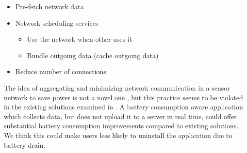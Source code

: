 \begin{itemize}
	\setlength\itemsep{-0.3em}
    \item Pre-fetch network data
    \item Network scheduling services
    \vspace{-0.8em}
    \begin{itemize}
    	\setlength\itemsep{-0.3em}
    	\item Use the network when other uses it
        \item Bundle outgoing data (cache outgoing data)
    \end{itemize}
    \vspace{-0.6em}
    \item Reduce number of connections
\end{itemize}

The idea of aggregating and minimizing network communication in a sensor network to save power is not a novel one \parencite{korteweg2007data} \parencite{mhatre2004design}, but this practice seems to be violated in the existing solutions examined in . A battery consumption aware application which collects data, but does not upload it to a server in real time, could offer substantial battery consumption improvements compared to existing solutions. We think this could make users less likely to uninstall the application due to battery drain.